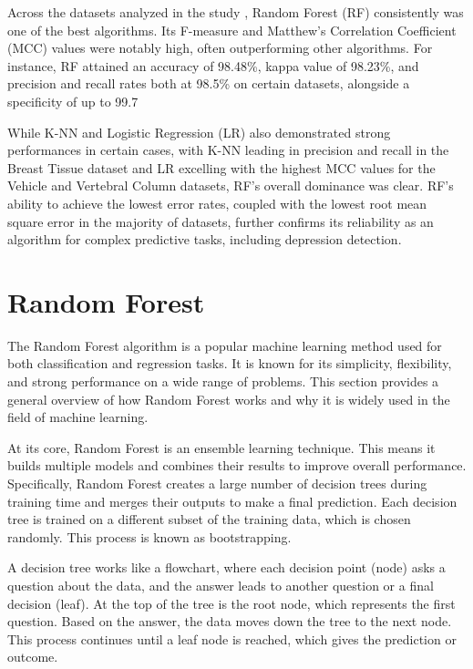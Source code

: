 Across the datasets analyzed in the study \cite{siraj2023performanceModelComparison}, Random Forest (RF) consistently was one of the best algorithms. Its F-measure and Matthew's Correlation Coefficient (MCC) values were notably high, often outperforming other algorithms. For instance, RF attained an accuracy of 98.48\%, kappa value of 98.23\%, and precision and recall rates both at 98.5\% on certain datasets, alongside a specificity of up to 99.7%

While K-NN and Logistic Regression (LR) also demonstrated strong performances in certain cases, with K-NN leading in precision and recall in the Breast Tissue dataset and LR excelling with the highest MCC values for the Vehicle and Vertebral Column datasets, RF's overall dominance was clear. RF's ability to achieve the lowest error rates, coupled with the lowest root mean square error in the majority of datasets, further confirms its reliability as an algorithm for complex predictive tasks, including depression detection.

\section{Random Forest}

\quad The Random Forest algorithm is a popular machine learning method used for both classification and regression tasks. It is known for its simplicity, flexibility, and strong performance on a wide range of problems. This section provides a general overview of how Random Forest works and why it is widely used in the field of machine learning.

At its core, Random Forest is an ensemble learning technique. This means it builds multiple models and combines their results to improve overall performance. Specifically, Random Forest creates a large number of decision trees during training time and merges their outputs to make a final prediction. Each decision tree is trained on a different subset of the training data, which is chosen randomly. This process is known as bootstrapping.

A decision tree works like a flowchart, where each decision point (node) asks a question about the data, and the answer leads to another question or a final decision (leaf). At the top of the tree is the root node, which represents the first question. Based on the answer, the data moves down the tree to the next node. This process continues until a leaf node is reached, which gives the prediction or outcome.


